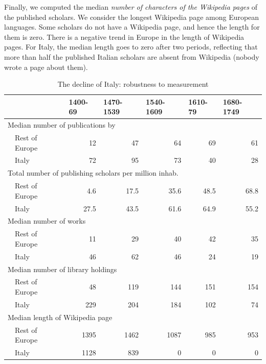 Finally, we computed the median \textit{number of characters of the Wikipedia pages} of the published scholars. We consider the longest Wikipedia page among European languages. Some scholars do not have a Wikipedia page, and hence the length for them is zero. There is a negative trend in Europe in the length of Wikipedia pages. For Italy, the median length goes to zero after two periods, reflecting that more than half the published Italian scholars are absent from Wikipedia (nobody wrote a page about them).


\begin{table}[hb]
\centering
\begin{tabular}{rlrrrrr}
\toprule
          &       & \multicolumn{1}{l}{1400-69} & \multicolumn{1}{l}{1470-1539} & \multicolumn{1}{l}{1540-1609} & \multicolumn{1}{l}{1610-79} & \multicolumn{1}{l}{1680-1749} \\
          \midrule
 \multicolumn{7}{l}{Median number of publications by}\\
  & Rest of Europe & 12       & 47       & 64       & 69       & 61 \\
        & Italy    & 72       & 95       & 73       & 40       & 28 \\
\multicolumn{7}{l}{Total number of publishing scholars per million inhab.}\\
 & Rest of Europe &4.6      & 17.5     & 35.6     & 48.5     & 68.8 \\
         & Italy  &27.5     & 43.5     & 61.6     & 64.9     & 55.2 \\
\multicolumn{7}{l}{Median number of works}   \\
 & Rest of Europe & 11       & 29       & 40       & 42       & 35 \\
       & Italy    & 46       & 62       & 46       & 24       & 19 \\
\multicolumn{7}{l}{Median number of library holdings}\\
 & Rest of Europe & 48       & 119      & 144      & 151      & 154 \\
       & Italy    & 229      & 204      & 184      & 102      & 74 \\
\multicolumn{7}{l}{Median length of Wikipedia page}\\
 & Rest of Europe & 1395     & 1462     & 1087     & 985      & 953 \\
       & Italy    & 1128     & 839      & 0        & 0        & 0 \\
         \bottomrule
\end{tabular}%
\caption{The decline of Italy: robustness to measurement}\label{tab:robustdecline}
\end{table}



